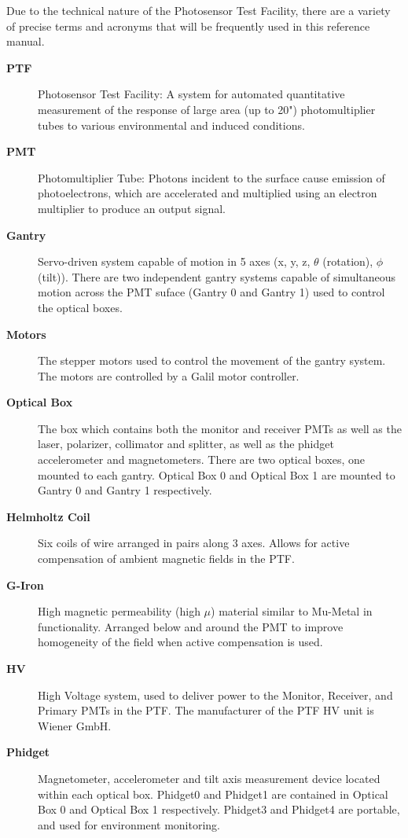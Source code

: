 \documentclass[twoside,letterpaper]{refart}
\begin{document}
Due to the technical nature of the Photosensor Test Facility, there are a variety of precise terms and acronyms that will be frequently used in this reference manual.

\begin{description}
	\item[\textbf{PTF}] Photosensor Test Facility: A system for automated quantitative measurement of the response of large area (up to 20") photomultiplier tubes to various environmental and induced conditions.
	\item[\textbf{PMT}] Photomultiplier Tube: Photons incident to the surface cause emission of photoelectrons, which are accelerated and multiplied using an electron multiplier to produce an output signal.
	\item[\textbf{Gantry}] Servo-driven system capable of motion in 5 axes (x, y, z, $\theta$ (rotation), $\phi$ (tilt)). There are two independent gantry systems capable of simultaneous motion across the PMT suface (Gantry 0 and Gantry 1) used to control the optical boxes.
	\item[\textbf{Motors}] The stepper motors used to control the movement of the gantry system. The motors are controlled by a Galil motor controller.
	\item[\textbf{Optical Box}] The box which contains both the monitor and receiver PMTs as well as the laser, polarizer, collimator and splitter, as well as the phidget accelerometer and magnetometers.  There are two optical boxes, one mounted to each gantry.  Optical Box 0 and Optical Box 1 are mounted to Gantry 0 and Gantry 1 respectively.
	\item[\textbf{Helmholtz Coil}] Six coils of wire arranged in pairs along 3 axes.  Allows for active compensation of ambient magnetic fields in the PTF.
	\item[\textbf{G-Iron}] High magnetic permeability (high $\mu$) material similar to Mu-Metal in functionality.  Arranged below and around the PMT to improve homogeneity of the field when active compensation is used.  
	\item[\textbf{HV}] High Voltage system, used to deliver power to the Monitor, Receiver, and Primary PMTs in the PTF. The manufacturer of the PTF HV unit is Wiener GmbH. 
	\item[\textbf{Phidget}] Magnetometer, accelerometer and tilt axis measurement device located within each optical box.  Phidget0 and Phidget1 are contained in Optical Box 0 and Optical Box 1 respectively.  Phidget3 and Phidget4 are portable, and used for environment monitoring.

\end{description}
\end{document}
